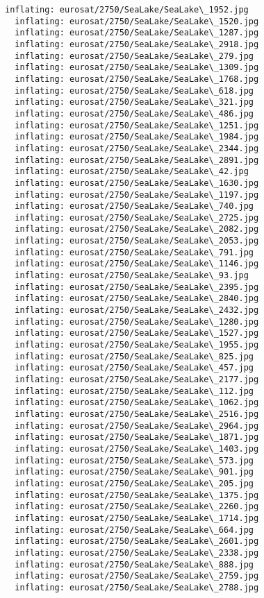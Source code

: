 \documentclass[11pt]{article}
\begin{document}
\begin{Verbatim}[commandchars=\\\{\}]
  inflating: eurosat/2750/SeaLake/SeaLake\_1952.jpg
  inflating: eurosat/2750/SeaLake/SeaLake\_1520.jpg
  inflating: eurosat/2750/SeaLake/SeaLake\_1287.jpg
  inflating: eurosat/2750/SeaLake/SeaLake\_2918.jpg
  inflating: eurosat/2750/SeaLake/SeaLake\_279.jpg
  inflating: eurosat/2750/SeaLake/SeaLake\_1309.jpg
  inflating: eurosat/2750/SeaLake/SeaLake\_1768.jpg
  inflating: eurosat/2750/SeaLake/SeaLake\_618.jpg
  inflating: eurosat/2750/SeaLake/SeaLake\_321.jpg
  inflating: eurosat/2750/SeaLake/SeaLake\_486.jpg
  inflating: eurosat/2750/SeaLake/SeaLake\_1251.jpg
  inflating: eurosat/2750/SeaLake/SeaLake\_1984.jpg
  inflating: eurosat/2750/SeaLake/SeaLake\_2344.jpg
  inflating: eurosat/2750/SeaLake/SeaLake\_2891.jpg
  inflating: eurosat/2750/SeaLake/SeaLake\_42.jpg
  inflating: eurosat/2750/SeaLake/SeaLake\_1630.jpg
  inflating: eurosat/2750/SeaLake/SeaLake\_1197.jpg
  inflating: eurosat/2750/SeaLake/SeaLake\_740.jpg
  inflating: eurosat/2750/SeaLake/SeaLake\_2725.jpg
  inflating: eurosat/2750/SeaLake/SeaLake\_2082.jpg
  inflating: eurosat/2750/SeaLake/SeaLake\_2053.jpg
  inflating: eurosat/2750/SeaLake/SeaLake\_791.jpg
  inflating: eurosat/2750/SeaLake/SeaLake\_1146.jpg
  inflating: eurosat/2750/SeaLake/SeaLake\_93.jpg
  inflating: eurosat/2750/SeaLake/SeaLake\_2395.jpg
  inflating: eurosat/2750/SeaLake/SeaLake\_2840.jpg
  inflating: eurosat/2750/SeaLake/SeaLake\_2432.jpg
  inflating: eurosat/2750/SeaLake/SeaLake\_1280.jpg
  inflating: eurosat/2750/SeaLake/SeaLake\_1527.jpg
  inflating: eurosat/2750/SeaLake/SeaLake\_1955.jpg
  inflating: eurosat/2750/SeaLake/SeaLake\_825.jpg
  inflating: eurosat/2750/SeaLake/SeaLake\_457.jpg
  inflating: eurosat/2750/SeaLake/SeaLake\_2177.jpg
  inflating: eurosat/2750/SeaLake/SeaLake\_112.jpg
  inflating: eurosat/2750/SeaLake/SeaLake\_1062.jpg
  inflating: eurosat/2750/SeaLake/SeaLake\_2516.jpg
  inflating: eurosat/2750/SeaLake/SeaLake\_2964.jpg
  inflating: eurosat/2750/SeaLake/SeaLake\_1871.jpg
  inflating: eurosat/2750/SeaLake/SeaLake\_1403.jpg
  inflating: eurosat/2750/SeaLake/SeaLake\_573.jpg
  inflating: eurosat/2750/SeaLake/SeaLake\_901.jpg
  inflating: eurosat/2750/SeaLake/SeaLake\_205.jpg
  inflating: eurosat/2750/SeaLake/SeaLake\_1375.jpg
  inflating: eurosat/2750/SeaLake/SeaLake\_2260.jpg
  inflating: eurosat/2750/SeaLake/SeaLake\_1714.jpg
  inflating: eurosat/2750/SeaLake/SeaLake\_664.jpg
  inflating: eurosat/2750/SeaLake/SeaLake\_2601.jpg
  inflating: eurosat/2750/SeaLake/SeaLake\_2338.jpg
  inflating: eurosat/2750/SeaLake/SeaLake\_888.jpg
  inflating: eurosat/2750/SeaLake/SeaLake\_2759.jpg
  inflating: eurosat/2750/SeaLake/SeaLake\_2788.jpg

\end{Verbatim}
\end{document}
